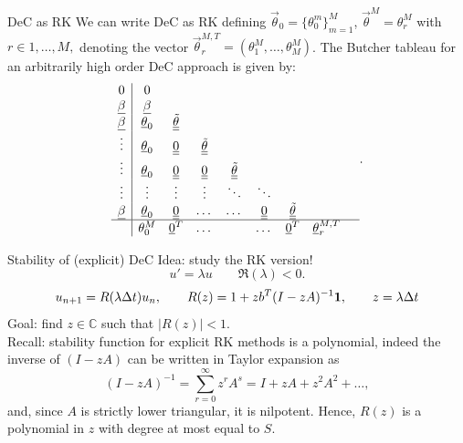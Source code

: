 \documentclass[aspectratio=169]{beamer}
\begin{document}
\begin{frame}{DeC as RK}
	We can write DeC as RK defining $\vec{\theta}_0 = \lbrace\theta_0^m\rbrace_{m=1}^M$, $\vec{\theta}^M=\theta_r^{M}$ with $r \in 1, \dots, M, $  denoting the vector  $ \vec{\theta}_r^{M,T} =(\theta_1^M, \dots, \theta_M^M )$.
		The Butcher tableau for an arbitrarily high order DeC approach is given by:
		\begin{equation}\label{eq:DeC_RK}
			\begin{aligned}
				\begin{array}{c|cccccccc}
					0 & 0 &   & &  & & &  & \\
					\underline{\beta} & \underline{\beta} &  &   & & & & &  \\
					\underline{\beta}  & \underline{\theta}_0 &   \underline{\underline{\tilde{\theta}}} & & & & & &\\
					\vdots & \underline{\theta}_0 & \underline{\underline{0}}  &\underline{\underline{\tilde{\theta}}}   && & & &\\
					\vdots & \underline{\theta}_0 &  \underline{\underline{0}}   &   \underline{\underline{0}}  & \underline{\underline{\tilde{\theta}}}  &  &  & &\\
					\vdots &  \vdots  &  \vdots &  \vdots &  \ddots  &  \ddots& & & \\
					\underline{\beta} & \underline{\theta}_0 &  \underline{\underline{0}}  &  \dots &  \dots & \underline{\underline{0}}  &  \underline{\underline{\tilde{\theta}}} & \\
					\hline
					&  \theta_0^M & \underline{0}^T    & \dots  &   &   \dots &    \underline{0}^T& \underline{\theta}_r^{M,T} 
				\end{array}.
			\end{aligned}
	\end{equation}
\end{frame}

\begin{frame}{Stability of (explicit) DeC}
	Idea: study the RK version!
\begin{equation}
	u'=\lambda u \qquad \Re(\lambda)<0.
\end{equation}
\begin{equation}
	u_{n+1}=R(\lambda \Delta t) u_n,\qquad	R(z) = 1+ z b^T (I-zA)^{-1} \mathbf{1},\qquad z=\lambda \Delta t
\end{equation}
Goal: find $z\in \mathbb C$ such that $\lvert R(z) \rvert< 1$. \\
Recall: stability function for explicit RK methods is a polynomial, indeed the inverse of $(I-zA)$ can be written in Taylor expansion as
\begin{equation}
	(I-zA)^{-1} = \sum_{r=0}^{\infty} z^r A^s = I + zA + z^2A^2+\dots, 
\end{equation} 
and, since $A$ is strictly lower triangular, it is nilpotent.
Hence, $R(z)$ is a polynomial in $z$ with degree at most equal to $S$.

\end{frame}
\end{document}
